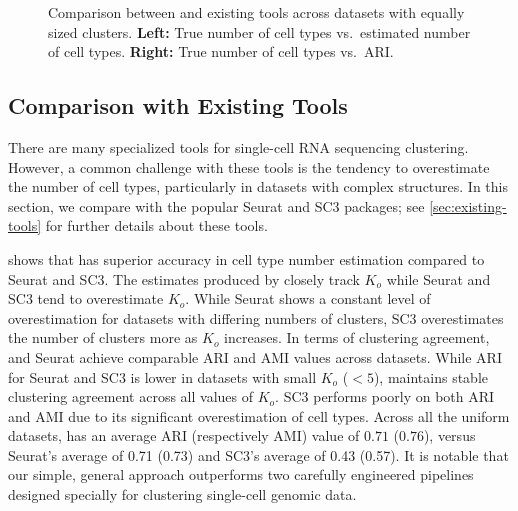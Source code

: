 \begin{figure}[t!]
	\centering
	\caption{Comparison between \methodname and existing tools across datasets with equally
		sized clusters.
		\textbf{Left:} True number of cell types vs.\ estimated number of cell types.
		\textbf{Right:}  True number of cell types vs.\ ARI.
	}
	\label{fig:tool_comp_unif}
\end{figure}

\subsection{Comparison with Existing Tools}

There are many specialized tools for single-cell RNA sequencing clustering.
However, a common challenge with these tools is the tendency to overestimate the number of cell types, particularly in datasets with complex structures. 
In this section, 
we compare \methodname with the popular Seurat  \citep{seurat} and SC3  \citep[Single-Cell Consensus Clustering;][]{sc3} packages; see \cref{sec:existing-tools} for further details about these tools.

 shows that \methodname has superior accuracy in cell type number estimation compared to Seurat and SC3. The estimates produced by \methodname closely track $K_o$ while Seurat and SC3 tend to overestimate $K_o$.
While Seurat shows a constant level of overestimation for datasets with differing numbers of clusters,
SC3 overestimates the number of clusters more as $K_o$ increases.
%
In terms of clustering agreement, \methodname and Seurat achieve comparable ARI and AMI values across datasets.
While ARI for Seurat and SC3 is lower in datasets with small $K_{o}$ ($< 5$),
\methodname maintains stable clustering agreement across all values of $K_o$.
SC3 performs poorly on both ARI and AMI due to its significant overestimation of cell types.
Across all the \textsf{uniform} datasets, \methodname has an average ARI (respectively AMI) value of $0.71$ ($0.76$), versus Seurat's average of 0.71 (0.73) and SC3's average of 0.43 (0.57).
It is notable that our simple, general approach outperforms
two carefully engineered pipelines designed specially for clustering single-cell genomic data.



